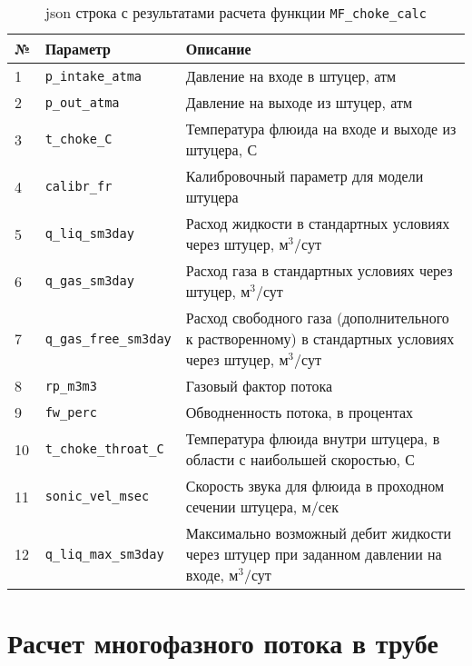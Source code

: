 \begin{table}[H]
	\caption{json строка с результатами расчета функции \texttt{MF_choke_calc} }
	\label{table:param_list_MF_choke_calc_json}
	\begin{tabular}{p{}p{}p{}}
		\hline
		№& Параметр & Описание  \\ \hline
		
		1 & \texttt{p_intake_atma} & Давление на входе в штуцер, атм    \\ \hline
		2 & \texttt{p_out_atma} & Давление на выходе из штуцер, атм    \\ \hline
		3 & \texttt{t_choke_C} & Температура флюида на входе и выходе из штуцера, С  \\ \hline
		4 & \texttt{calibr_fr} & Калибровочный параметр для модели штуцера  \\ \hline
		5 & \texttt{q_liq_sm3day} & Расход жидкости в стандартных условиях через штуцер, м$^3$/сут    \\ \hline
		6 & \texttt{q_gas_sm3day} & Расход газа в стандартных условиях через штуцер, м$^3$/сут    \\ \hline
		7 & \texttt{q_gas_free_sm3day} & Расход свободного газа (дополнительного к растворенному) в стандартных условиях через штуцер, м$^3$/сут    \\ \hline
		8 & \texttt{rp_m3m3} &  Газовый фактор потока  \\ \hline
		9 & \texttt{fw_perc} &  Обводненность потока, в процентах \\ \hline
		10 & \texttt{t_choke_throat_C} & Температура флюида внутри штуцера, в области с наибольшей скоростью, С  \\ \hline
		11 & \texttt{sonic_vel_msec} & Скорость звука для флюида в проходном сечении штуцера, м/сек  \\ \hline
		12 & \texttt{q_liq_max_sm3day} & Максимально возможный дебит жидкости через штуцер при заданном давлении на входе, м$^3$/сут  \\ \hline
		
	\end{tabular}
\end{table}

\newpage
\section{Расчет многофазного потока в трубе}

